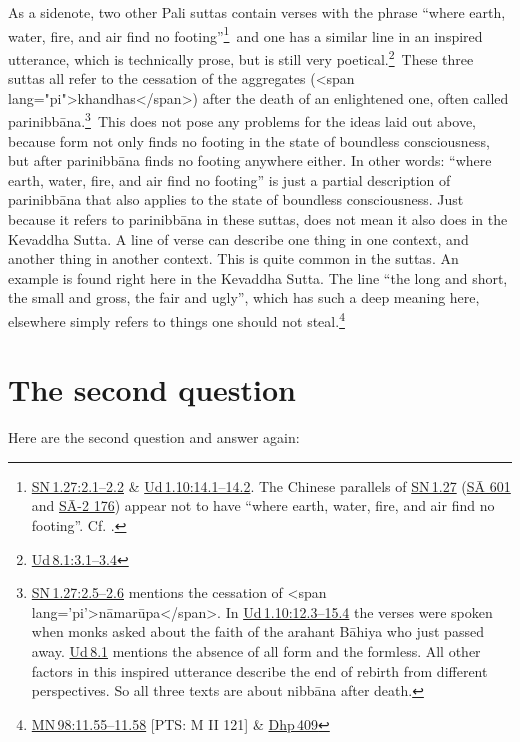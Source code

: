 \documentclass[10pt, openright]{book}
\begin{document}
As a sidenote, two other Pali suttas contain verses with the phrase “where earth, water, fire, and air find no footing”\footnote {\href{https://suttacentral.net/sn1.27/en/sujato\#2.1}{SN 1.27:2.1–2.2} \& \href{https://suttacentral.net/ud1.10/en/sujato\#14.1}{Ud 1.10:14.1–14.2}. The Chinese parallels of \href{https://suttacentral.net/sn1.27/en/sujato}{SN 1.27} (\href{https://suttacentral.net/sa601}{SĀ 601} and \href{https://suttacentral.net/sa-2.176}{SĀ-2 176}) appear not to have “where earth, water, fire, and air find no footing”. Cf. \cite{Sujato 2011b}.} and one has a similar line in an inspired utterance, which is technically prose, but is still very poetical.\footnote {\href{https://suttacentral.net/ud8.1/en/sujato\#3.1}{Ud 8.1:3.1–3.4}} These three suttas all refer to the cessation of the aggregates (<span lang="pi">khandhas</span>) after the death of an enlightened one, often called parinibbāna.\footnote {\href{https://suttacentral.net/sn1.27/en/sujato\#2.5}{SN 1.27:2.5–2.6} mentions the cessation of <span lang='pi'>nāmarūpa</span>. In \href{https://suttacentral.net/ud1.10/en/sujato\#12.3}{Ud 1.10:12.3–15.4} the verses were spoken when monks asked about the faith of the arahant Bāhiya who just passed away. \href{https://suttacentral.net/ud8.1/en/sujato}{Ud 8.1} mentions the absence of all form and the formless. All other factors in this inspired utterance describe the end of rebirth from different perspectives. So all three texts are about nibbāna after death.} This does not pose any problems for the ideas laid out above, because form not only finds no footing in the state of boundless consciousness, but after parinibbāna finds no footing anywhere either. In other words: “where earth, water, fire, and air find no footing” is just a partial description of parinibbāna that also applies to the state of boundless consciousness. Just because it refers to parinibbāna in these suttas, does not mean it also does in the Kevaddha Sutta. A line of verse can describe one thing in one context, and another thing in another context. This is quite common in the suttas. An example is found right here in the Kevaddha Sutta. The line “the long and short, the small and gross, the fair and ugly”, which has such a deep meaning here, elsewhere simply refers to things one should not steal.\footnote {\href{https://suttacentral.net/mn98/en/sujato\#11.55}{MN 98:11.55–11.58} [PTS: M II 121] \& \href{https://suttacentral.net/dhp409/en/sujato}{Dhp 409}}




\section{The second question}
Here are the second question and answer again:
\end{document}
